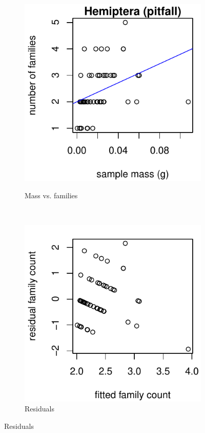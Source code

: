 \documentclass[10pt,letterpaper,twocolumn]{article}
\begin{document}
\begin{figure}[h]
	\centering
	\begin{subfigure}[b]{0.15\textwidth}
		\caption{Mass vs. families}
		\includegraphics[width=\textwidth]{plots/mass-vs-count/scatter/2015_pitfall_Hemiptera_mass-vs-count.pdf}
		\label{fig:pitfall_hemiptera_scatter}
	\end{subfigure}
	~
	\begin{subfigure}[b]{0.15\textwidth}
		\caption{Residuals}
		\includegraphics[width=\textwidth]{plots/mass-vs-count/residual/2015_pitfall_Hemiptera_residual.pdf}

\end{subfigure}
\end{figure}
\end{document}
